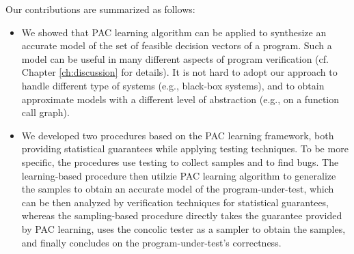 Our contributions are summarized as follows:
\begin{itemize}
	\item We showed that PAC learning algorithm can be applied to synthesize an accurate model of the set of feasible decision vectors of a program. Such a model can be useful in many different aspects of program verification (cf. Chapter \ref{ch:discussion} for details). It is not hard to adopt our approach to handle different type of systems (e.g., black-box systems), and to obtain approximate models with a different level of abstraction (e.g., on a function call graph).
	\item We developed two procedures based on the PAC learning framework, both providing statistical guarantees while applying testing techniques. To be more specific, the procedures use testing to collect samples and to find bugs. The learning-based procedure then utilzie PAC learning algorithm to generalize the samples to obtain an accurate model of the program-under-test, which can be then analyzed by verification techniques for statistical guarantees, whereas the sampling-based procedure directly takes the guarantee provided by PAC learning, uses the concolic tester as a sampler to obtain the samples, and finally concludes on the program-under-test's correctness. 
\end{itemize}

